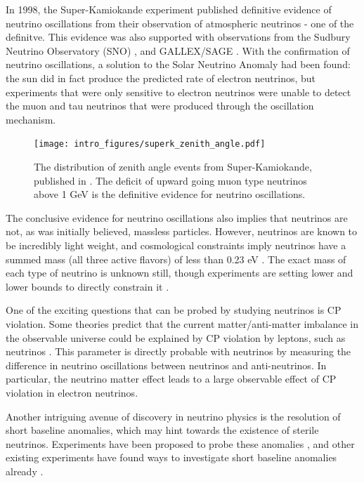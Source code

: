In 1998, the Super-Kamiokande experiment published definitive evidence of neutrino oscillations from their observation of atmospheric neutrinos \cite{PhysRevLett.81.1562} - one of the definitve.  This evidence was also supported with observations from the Sudbury Neutrino Observatory (SNO) \cite{Ahmad:2002jz}, and GALLEX/SAGE \cite{Hampel:1997fc, Abdurashitov:1998ne}.  With the confirmation of neutrino oscillations, a solution to the Solar Neutrino Anomaly had been found: the sun did in fact produce the predicted rate of electron neutrinos, but experiments that were only sensitive to electron neutrinos were unable to detect the muon and tau neutrinos that were produced through the oscillation mechanism.  

\begin{figure}[htbp]
  \centering
  \texttt{[image: intro\_figures/superk\_zenith\_angle.pdf]}
  \caption[Super-Kamiokande Zenith Angle Distribution]{The distribution of zenith angle events from Super-Kamiokande, published in \cite{PhysRevLett.81.1562}.  The deficit of upward going muon type neutrinos above 1 GeV is the definitive evidence for neutrino oscillations.}
  \label{fig:label}
\end{figure}

The conclusive evidence for neutrino oscillations also implies that neutrinos are not, as was initially believed, massless particles.  However, neutrinos are known to be incredibly light weight, and cosmological constraints imply neutrinos have a summed mass (all three active flavors) of less than 0.23 eV \cite{Abazajian:2011dt, Ade:2013zuv}.  The exact mass of each type of neutrino is unknown still, though experiments are setting lower and lower bounds to directly constrain it \cite{BORNSCHEIN200514, Mertens:2014nha}.

One of the exciting questions that can be probed by studying neutrinos is CP violation.  Some theories predict that the current matter/anti-matter imbalance in the observable universe could be explained by CP violation by leptons, such as neutrinos \cite{Nunokawa:2007qh}.  This parameter is directly probable with neutrinos by measuring the difference in neutrino oscillations between neutrinos and anti-neutrinos.  In particular, the neutrino matter effect \cite{Wolfenstein:1977ue, Mikheev:1986gs} leads to a large observable effect of CP violation in electron neutrinos.

Another intriguing avenue of discovery in neutrino physics is the resolution of short baseline anomalies, which may hint towards the existence of sterile neutrinos.  Experiments have been proposed to probe these anomalies \cite{Antonello:2015lea, Ashenfelter:2015uxt}, and other existing experiments have found ways to investigate short baseline anomalies already \cite{TheIceCube:2016oqi, Adamson:2010wi, MINOS:2016viw, An:2014bik}.

